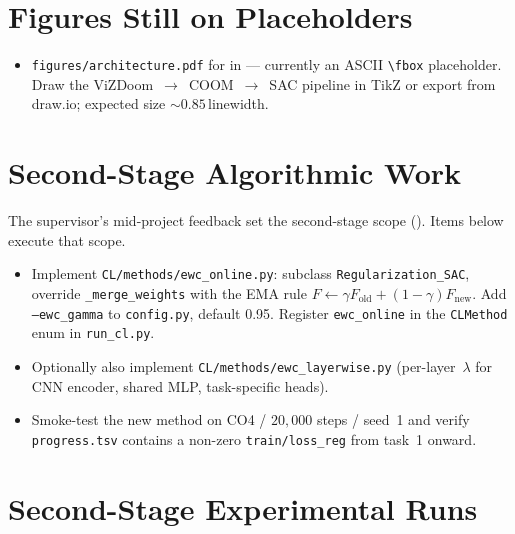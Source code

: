 \section*{Figures Still on Placeholders}

\begin{itemize}
    \item \texttt{figures/architecture.pdf} for
         in  --- currently an ASCII
        \texttt{\textbackslash fbox} placeholder. Draw the
        ViZDoom~$\rightarrow$~COOM~$\rightarrow$~SAC pipeline in TikZ
        or export from draw.io; expected size $\sim 0.85$\,linewidth.
\end{itemize}

\section*{Second-Stage Algorithmic Work}

The supervisor's mid-project feedback set the second-stage scope
(). Items below execute that scope.

\begin{itemize}
    \item Implement \texttt{CL/methods/ewc\_online.py}: subclass
        \texttt{Regularization\_SAC}, override \texttt{\_merge\_weights}
        with the EMA rule
        $F \leftarrow \gamma F_{\text{old}} + (1 - \gamma) F_{\text{new}}$.
        Add \texttt{--ewc\_gamma} to \texttt{config.py}, default 0.95.
        Register \texttt{ewc\_online} in the \texttt{CLMethod} enum
        in \texttt{run\_cl.py}.
    \item Optionally also implement
        \texttt{CL/methods/ewc\_layerwise.py} (per-layer~$\lambda$ for
        CNN encoder, shared MLP, task-specific heads).
    \item Smoke-test the new method on CO4 / $20{,}000$ steps /
        seed~1 and verify \texttt{progress.tsv} contains a non-zero
        \texttt{train/loss\_reg} from task~1 onward.
\end{itemize}

\section*{Second-Stage Experimental Runs}

